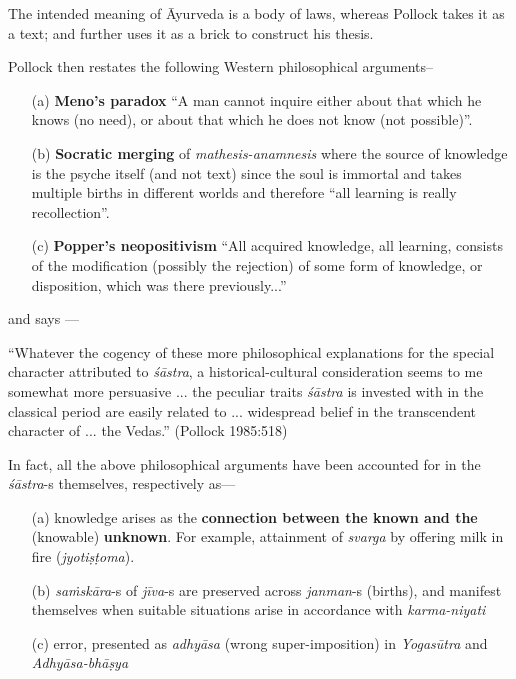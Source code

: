 \newpage

The intended meaning of Āyurveda is a body of laws, whereas Pollock takes it as a text; and further uses it as a brick to construct his thesis. 

Pollock then restates the following Western philosophical arguments--
\begin{itemize}
\itemsep=1pt
\item[(a)] {\bf Meno's paradox}  ``A man cannot inquire either about that which he knows (no need), or about that which he does not know (not possible)''.

\item[(b)] {\bf Socratic merging} of {\sl mathesis-anamnesis} where the source of knowledge is the psyche itself (and not text) since the soul is immortal and takes multiple births in different worlds and therefore ``all learning is really recollection''.

\item[(c)] {\bf Popper's neopositivism} ``All acquired knowledge, all learning, consists of the modiﬁcation (possibly the rejection) of some form of knowledge, or disposition, which was there previously...''
\end{itemize}
and says ---
\begin{myquote}
``Whatever the cogency of these more philosophical explanations for the special character attributed to {\sl śāstra}, a historical-cultural consideration seems to me somewhat more persuasive ... the peculiar traits {\sl śāstra} is invested with in the classical period are easily related to ... widespread belief in the transcendent character of ... the Vedas.'' (Pollock 1985:518)
\end{myquote}

In fact, all the above philosophical arguments have been accounted for in the {\sl śāstra}-s themselves, respectively as---
\begin{itemize}
\itemsep=1pt
\item[(a)] knowledge arises as the {\bf connection between the known and the } (knowable) {\bf unknown}. For example, attainment of {\sl svarga} by offering milk in ﬁre ({\sl jyotiṣṭoma}).

\item[(b)] {\sl saṁskāra}-s of {\sl jīva}-s are preserved across {\sl janman}-s (births), and manifest themselves when suitable situations arise in accordance with {\sl karma-niyati}

\item[(c)] error, presented as {\sl adhyāsa} (wrong super-imposition) in {\sl Yogasūtra} and {\sl Adhyāsa-bhāṣya}
\end{itemize}

